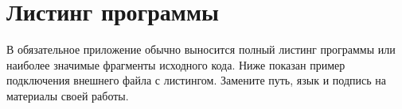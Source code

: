 \chapter{Листинг программы}\label{app:code}

В обязательное приложение обычно выносится полный листинг программы или
наиболее значимые фрагменты исходного кода. Ниже показан пример подключения
внешнего файла с листингом. Замените путь, язык и подпись на материалы своей
работы.



